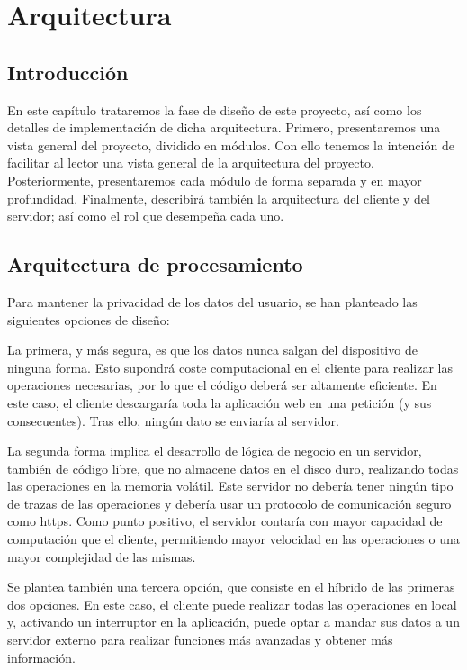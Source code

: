 \chapter{Arquitectura}
\label{chap:architecture}


\section{Introducción}
\label{sec:introduction}

En este capítulo trataremos la fase de diseño de este proyecto, así como los detalles de implementación de dicha arquitectura. Primero, presentaremos una vista general del proyecto, dividido en módulos. Con ello tenemos la intención de facilitar al lector una vista general de la arquitectura del proyecto. Posteriormente, presentaremos cada módulo de forma separada y en mayor profundidad. Finalmente, describirá también la arquitectura del cliente y del servidor; así como el rol que desempeña cada uno.

\section{Arquitectura de procesamiento}
\label{chap:architecture:processing}

Para mantener la privacidad de los datos del usuario, se han planteado las siguientes opciones de diseño:

La primera, y más segura, es que los datos nunca salgan del dispositivo de ninguna forma. Esto supondrá coste computacional en el cliente para realizar las operaciones necesarias, por lo que el código deberá ser altamente eficiente. En este caso, el cliente descargaría toda la aplicación web en una petición (y sus consecuentes). Tras ello, ningún dato se enviaría al servidor.

La segunda forma implica el desarrollo de lógica de negocio en un servidor, también de código libre, que no almacene datos en el disco duro, realizando todas las operaciones en la memoria volátil. Este servidor no debería tener ningún tipo de trazas de las operaciones y debería usar un protocolo de comunicación seguro como \acrfull{https}. Como punto positivo, el servidor contaría con mayor capacidad de computación que el cliente, permitiendo mayor velocidad en las operaciones o una mayor complejidad de las mismas.

Se plantea también una tercera opción, que consiste en el híbrido de las primeras dos opciones. En este caso, el cliente puede realizar todas las operaciones en local y, activando un interruptor en la aplicación, puede optar a mandar sus datos a un servidor externo para realizar funciones más avanzadas y obtener más información.

